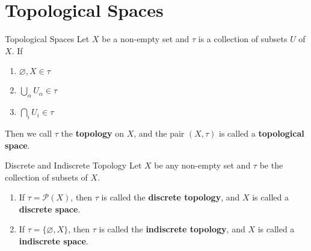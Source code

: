 \section{Topological Spaces}

\begin{definition}{Topological Spaces}{}
    Let $X$ be a non-empty set and $\tau$ is a collection of subsets
    $U$ of $X$. If

    \begin{enumerate}

        \item $\varnothing, X \in \tau$
        \item $\bigcup_{\alpha} U_{\alpha} \in \tau$
        \item $\bigcap_{i} U_{i} \in \tau$

    \end{enumerate}

    Then we call $\tau$ the \textbf{topology} on $X$, and the pair
    $(X,\tau)$ is called a \textbf{topological space}.
\end{definition}

\begin{definition}{Discrete and Indiscrete Topology}{}
    Let $X$ be any non-empty set and $\tau$ be the collection of subsets of $X$.
    \begin{enumerate}

        \item If $\tau = \mathcal{P}(X)$, then $\tau$ is called the
            \textbf{discrete topology}, and $X$ is called a
            \textbf{discrete space}.
        \item If $\tau = \{\varnothing, X\}$, then $\tau$ is called the
            \textbf{indiscrete topology}, and $X$ is called a
            \textbf{indiscrete space}.

    \end{enumerate}
\end{definition}
